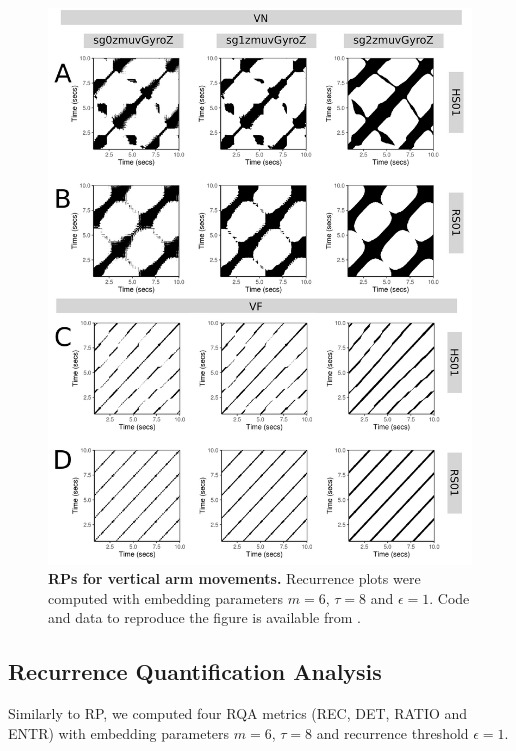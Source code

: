 \documentclass[fleqn,10pt]{wlscirep}
\begin{document}
\begin{figure}[ht]
\centering
\includegraphics[width=1.0\textwidth]{figures/rps/pdf/rp_aV}
\caption{
	{\bf RPs for vertical arm movements.}	
	Recurrence plots were computed with 
	embedding parameters $m=6$, $\tau=8$ and $\epsilon=1$.
	Code and data to reproduce the figure is available from \cite{srep2019}.
        }
    \label{fig:rp_aV}
\end{figure}






\subsection*{Recurrence Quantification Analysis} \label{ch6:rqas}
Similarly to RP, we computed four RQA metrics (REC, DET, RATIO and ENTR) 
with embedding parameters $m=6$, $\tau=8$ and 
recurrence threshold $\epsilon=1$.
 
\end{document}
